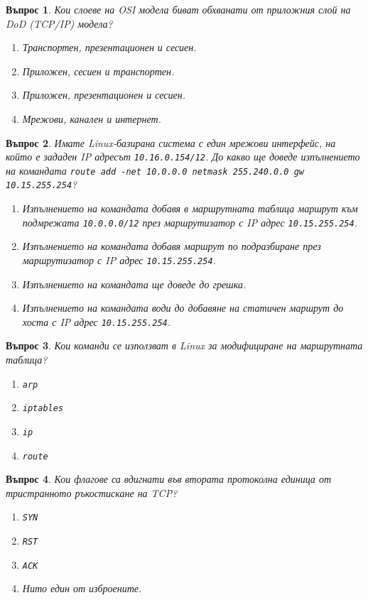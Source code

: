 \documentclass[11pt]{scrartcl}
\newtheorem{q}{Въпрос}
\newenvironment{defractors}{
\begin{enumerate}
  \setlength{\itemsep}{1pt}
  \setlength{\parskip}{0pt}
  \setlength{\parsep}{0pt}
}{\end{enumerate}}
\begin{document}
\begin{q}
  Кои слоеве на OSI модела биват обхванати от приложния слой на DoD (TCP/IP) модела?

  \begin{defractors}
    \item Транспортен, презентационен и сесиен.
    \item Приложен, сесиен и транспортен.
    \item Приложен, презентационен и сесиен.
    \item Мрежови, канален и интернет.
  \end{defractors}
\end{q}

\begin{q}
  Имате Linux-базирана система с един мрежови интерфейс, на който е зададен IP
  адресът \texttt{10.16.0.154/12}. До какво ще доведе изпълнението на командата
  \texttt{route add -net 10.0.0.0 netmask 255.240.0.0 gw 10.15.255.254}?

  \begin{defractors}
  \item Изпълнението на командата добавя в маршрутната таблица маршрут към
    подмрежата \texttt{10.0.0.0/12} през маршрутизатор с IP адрес
    \texttt{10.15.255.254}.
    \item Изпълнението на командата добавя маршрут по подразбиране през
      маршрутизатор с IP адрес \texttt{10.15.255.254}.
    \item Изпълнението на командата ще доведе до грешка.
    \item Изпълнението на командата води до добавяне на статичен маршрут до
      хоста с IP адрес \texttt{10.15.255.254}.
 \end{defractors}
\end{q}

\begin{q}
  Кои команди се използват в Linux за модифициране на маршрутната таблица?

  \begin{defractors}
    \item \texttt{arp}
    \item \texttt{iptables}
    \item \texttt{ip}
    \item \texttt{route}
  \end{defractors}
\end{q}

\begin{q}
  Кои флагове са вдигнати във втората протоколна единица от тристранното
  ръкостискане на TCP?

  \begin{defractors}
    \item \texttt{SYN}
    \item \texttt{RST}
    \item \texttt{ACK}
    \item Нито един от изброените.
  \end{defractors}
\end{q}
\end{document}
